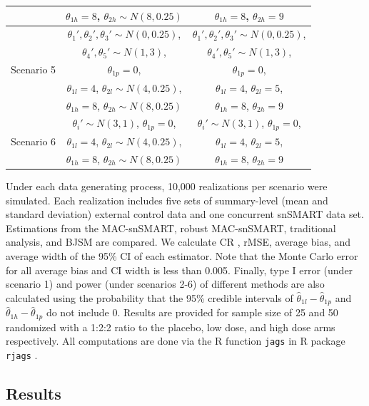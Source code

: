 \begin{table}
\begin{center}
\begin{tabular}{ccc}
 & $\theta_{1h} = 8$,  $\theta_{2h} \sim N(8, 0.25)$ & $\theta_{1h} = 8$, $\theta_{2h} = 9$\\  
\hline
\multirow{5}{4.5em}{Scenario 5} & $\theta_1', \theta_2', \theta_3' \sim N(0, 0.25)$, & $\theta_1', \theta_2', \theta_3' \sim N(0, 0.25)$, \\
& $\theta_4', \theta_5' \sim N(1,3) $, &  $\theta_4', \theta_5' \sim N(1,3) $, \\
& $\theta_{1p} = 0$, & $\theta_{1p} = 0$,\\
 & $\theta_{1l} = 4$, $\theta_{2l} \sim N(4, 0.25)$, & $\theta_{1l} = 4$, $\theta_{2l} = 5$, \\
 & $\theta_{1h} = 8$,  $\theta_{2h} \sim N(8, 0.25)$ & $\theta_{1h} = 8$, $\theta_{2h} = 9$\\  
\hline
\multirow{3}{4.5em}{Scenario 6} & $\theta_i' \sim N(3, 1)$, $\theta_{1p} = 0$, & $\theta_i' \sim N(3, 1)$, $\theta_{1p} = 0$,\\
 & $\theta_{1l} = 4$, $\theta_{2l} \sim N(4, 0.25)$, & $\theta_{1l} = 4$, $\theta_{2l} = 5$, \\
 & $\theta_{1h} = 8$,  $\theta_{2h} \sim N(8, 0.25)$ & $\theta_{1h} = 8$, $\theta_{2h} = 9$\\ 
\hline
\end{tabular}
\end{center}
\end{table}

Under each data generating process, 10,000 realizations per scenario were simulated. Each realization includes five sets of summary-level (mean and standard deviation) external control data and one concurrent \ac{snSMART} data set. Estimations from the MAC-snSMART, robust MAC-snSMART, traditional analysis, and \ac{BJSM} are compared. We calculate  \ac{CR} , \ac{rMSE}, average bias, and average width of the 95\% \ac{CI} of each estimator. Note that the Monte Carlo error for all average bias and \ac{CI} width is less than 0.005. Finally, type I error (under scenario 1) and power (under scenarios 2-6) of different methods are also calculated using the probability that the 95\% credible intervals of $\widehat{\theta}_{1l} - \widehat{\theta}_{1p}$ and $\widehat{\theta}_{1h} - \widehat{\theta}_{1p}$ do not include 0. Results are provided for sample size of 25 and 50 randomized with a 1:2:2 ratio to the placebo, low dose, and high dose arms respectively. All computations are done via the R function \texttt{jags} in R package \texttt{rjags} \citep{rjags}.

\subsection{Results} \label{s:results}

